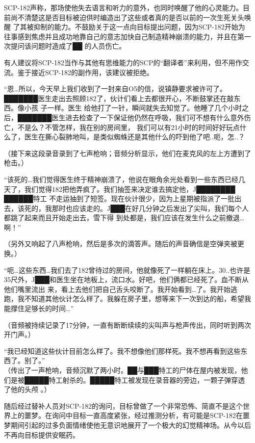 SCP-182声称，那场使他失去语言和听力的意外，也同时唤醒了他的心灵能力。目前尚不清楚这是否目标被迫供时编造出了这些或者真的是否以前的一次生死关头唤醒
了其被抑制的能力。不鼓励关于这一点向目标提出问题，因为SCP-182开始为往事感到焦虑并且成功地靠自己的意志加快自己制造精神崩溃的能力，并且在第一次提问该问题时造成了██
的人员伤亡。

有人建议将SCP-182当作与其他有思维能力的SCP的“翻译者”来利用，但不用作交流。鉴于接近SCP-182的副作用，该建议被拒绝。


\begin{scpbox}


“恩…所以，今天早上我们收到了一封来自O5的信，说镇静要求被许可了。███\allowbreak ████医生走出去照顾182了，伙计们看上去都很开心，不断鼓掌还在敲东西。像小孩
子一样。医生
给他打了一针，瞬间就失去知觉了。他睡了几个小时之后，███████医生进去检查了一下保证他仍然在呼吸，我们可不想有什么意外伤亡，不是么？不管怎样，我在别的房间里，
我们可以有21小时的时间好好玩点什么了，医生在撕心裂肺地叫，是类似蜘蛛还是其他什么的吓到他了吧..呃，怎..？

（接下来这段录音录到了七声枪响；音频分析显示，他们在麦克风的左上方遭到了枪击。）

“该死的…我们觉得医生终于精神崩溃了，他说在眼角余光处看到一些东西已经几天了，我们觉得182把他弄疯了。我们抽签来决定谁去搞定他，J████████ ██████特工
不走运抽到了短签。现在伙计很少，因为上星期被指派了一批出去，该死的，我那时也应该走的。J███在好几分钟之后发出了尖叫，我们每个人都跳了起来而且开始走出去，雪下得
到处都是，我们应该在发生什么之前撤退…啊！”

（另外又响起了八声枪响，然后是多次的滴答声。随后的声音确信是空弹夹被更换。）

“呃…这些东西…我们去了182曾待过的房间，他就像死了一样躺在床上。30..也许是35尺外，J███和医生坐在地板上，流口水。好吧，他们俩都已经死了。血不断从他们嘴里流出
来，看上去他们把自己舌头咬断了。我开始看到…了。我开始逃跑，我不知道其他伙计怎么样了。我躲在房子里，想等来下一次到达的船，希望我能撑住足够长的时间…”

（音频被持续记录了17分钟，一直有断断续续的尖叫声与枪声传出，同时听到两次开门声。）

“我已经知道这些伙计目前怎么样了。我不想像他们那样死。我不想再看到这些东西了。别了。”\\
（传出了一声枪响，音频沉默了两小时。██与███特工的尸体在屋内被发现，他们是被█████特工射杀的。█████特工被发现在录音器的旁边，一颗子弹穿透了他的头颅
。）

随后经过替补人员对SCP-182的询问，目标曾做了一个非常恐怖、简直不是这个世界上的噩梦。在询问中目标一直高度紧张，经过推测分析，有可能是SCP-182在噩
梦期间引起的过多负面情绪使他无意识地展开了一个极大的幻觉精神场。从今以后不再向目标提供安眠药。

\end{scpbox}
